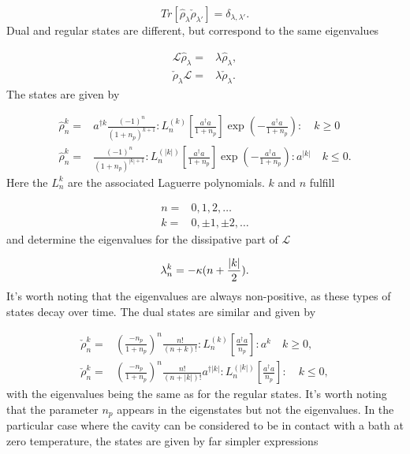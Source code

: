 \documentclass[12pt]{article}
\begin{document}
\begin{equation}
    Tr[\hat{\rho}_{\lambda} \check{\rho}_{\lambda'}] = \delta_{\lambda,\lambda'}. 
\end{equation} Dual and regular states are different, but correspond to the same eigenvalues

\begin{align}
    \mathcal{L}\hat{\rho}_\lambda =& \lambda \hat{\rho}_\lambda, \\
    \check{\rho}_\lambda\mathcal{L} =& \lambda \check{\rho}_\lambda.
\end{align} The states are given by

\begin{align}
  \hat{\rho}_n^k=& a^{\dagger k} \frac{(-1)^{n}}{(1+n_p)^{k+1}}: L_{n}^{(k)}\left[\frac{a^{\dagger} a}{1+n_p}\right] \exp \left(-\frac{a^{\dagger} a}{1+n_p}\right):  \quad k \geq 0 \nonumber\\
    \hat{\rho}_n^k=& \frac{(-1)^{n}}{(1+n_p)^{|k|+1}}: L_{n}^{(|k|)}\left[\frac{a^{\dagger} a}{1+n_p}\right] \exp \left(-\frac{a^{\dagger} a}{1+n_p}\right): a^{|k|}  \quad k \leq 0 . \nonumber
\end{align} Here the $L_n^k$ are the associated Laguerre polynomials. $k$ and $n$ fulfill

\begin{align}
    n=&0,1,2,\dots \\
    k=&0,\pm 1,\pm 2, \dots
\end{align} and determine the eigenvalues for the dissipative part of $\mathcal{L}$

\begin{equation}
    \lambda_n^k=-\kappa (n+\frac{\abs{k}}{2}).
\end{equation} It's worth noting that the eigenvalues are always non-positive, as these types of states decay over time. The dual states are similar and given by

\begin{align}
    \check{\rho}_n^k=&\left(\frac{-n_p}{1+n_p}\right)^{n} \frac{n !}{(n+k) !}: L_{n}^{(k)}\left[\frac{a^{\dagger} a}{n_p}\right]: a^{k} \quad  k \geq 0, \nonumber \\
   \check{\rho}_n^k=&\left(\frac{-n_p}{1+n_p}\right)^{n} \frac{n !}{(n+|k|) !} a^{\dagger|k|}: L_{n}^{(|k|)}\left[\frac{a^{\dagger} a}{n_p}\right]: \quad k \leq 0, \nonumber
\end{align} with the eigenvalues being the same as for the regular states. It's worth noting that the parameter $n_p$ appears in the eigenstates but not the eigenvalues. In the particular case where the cavity can be considered to be in contact with a bath at zero temperature, the states are given by far simpler expressions
\end{document}
